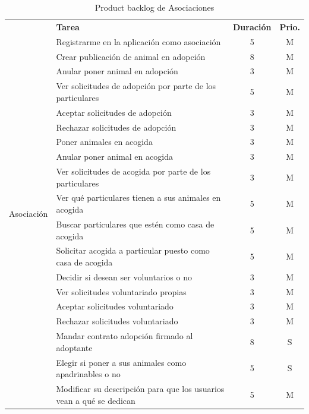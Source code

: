 \begin{table}[H]
	\centering
	\begin{tabular}{|c |p{8cm}|c |c|} \hline 
		\multirow[c]{25}{*}{Asociación}&  \textbf{Tarea}&  \textbf{Duración}& \textbf{Prio.}\\  \cline{2-4}
		
		&  Registrarme en la aplicación como asociación&  5& M\\ \cline{2-4} 
		&  Crear publicación de animal en adopción&  8& M\\ \cline{2-4} 
		&  Anular poner animal en adopción&  3& M\\ \cline{2-4} 
		&  Ver solicitudes de adopción por parte de los particulares&  5& M\\ \cline{2-4}
		&  Aceptar solicitudes de adopción&  3& M\\ \cline{2-4}
		&  Rechazar solicitudes de adopción&  3& M\\ \cline{2-4}
		
		
		&  Poner animales en acogida&  3& M\\ \cline{2-4}
		&  Anular poner animal en acogida&  3& M\\ \cline{2-4} 
		&  Ver solicitudes de acogida por parte de los particulares&  3& M\\ \cline{2-4}
		
		&  Ver qué particulares tienen a sus animales en acogida&  5& M\\ \cline{2-4}
		&  Buscar particulares que estén como casa de acogida&  5& M\\ \cline{2-4}
		&  Solicitar acogida a particular puesto como casa de acogida &  5& M\\ \cline{2-4}
		
		
		&  Decidir si desean ser voluntarios o no&  3& M\\ \cline{2-4}
		&  Ver solicitudes voluntariado propias&  3& M\\ \cline{2-4}
		&  Aceptar solicitudes voluntariado&  3& M\\ \cline{2-4}
		&  Rechazar solicitudes voluntariado&  3& M\\ \cline{2-4}
		
		&  Mandar contrato adopción firmado al adoptante&  8& S\\ \cline{2-4}
		
		&  Elegir si poner a sus animales como apadrinables o no &  5& S\\ \cline{2-4}
		
		&  Modificar su descripción para que los usuarios vean a qué se dedican & 5 & M \\ \hline
		
		
		
		
	\end{tabular}
	\caption{Product backlog de Asociaciones}
	\label{tab:pb_asociaciones}
\end{table}


